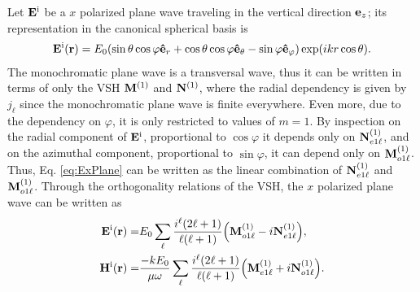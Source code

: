 
 Let $\vb{E}^{\text{i}}$ be a $x$ polarized plane wave traveling in the vertical direction $\vb{e}_z$; its representation in the canonical spherical basis is
 \begin{align}
 \vb{E}^{\text{i}} (\vb{r})= E_0\qty(\sin\theta\cos\varphi \vu{e}_r +
					\cos\theta\cos\varphi \vu{e}_\theta
					- \sin\varphi \vu{e}_\varphi) \exp(ikr\cos\theta).
	\label{eq:ExPlane}
 \end{align}
The monochromatic plane wave is a transversal wave, thus it can be written in terms of only the VSH $\vb{M}^{(1)}$ and $\vb{N}^{(1)}$, where the radial dependency is given by $j_\ell$ since the monochromatic plane wave is finite everywhere. Even more, due to the dependency on $\varphi$, it is only restricted to values of $m = 1$. By inspection on the radial component of $\vb{E}^\text{i}$, proportional to $\cos\varphi$ it depends only on $\vb{N}_{e1\ell}^{(1)}$, and on the azimuthal component, proportional to $\sin\varphi$, it can depend only on $\vb{M}_{o1\ell}^{(1)}$. Thus, Eq. \eqref{eq:ExPlane} can be written as the linear combination of  $\vb{N}_{e1\ell}^{(1)}$ and $\vb{M}_{o1\ell}^{(1)}$. Through the orthogonality relations of the VSH, the $x$ polarized plane wave can be written as \cite{stratton_electromagnetic_2012}
  \begin{subequations}
 \begin{align}
 \vb{E}^\text{i} (\vb{r})=& E_0 \sum_\ell\frac{i^\ell(2\ell+1)}{\ell(\ell+1)}\qty( \vb{M}_{o1\ell}^{(1)} -i \vb{N}_{e1\ell}^{(1)}),
\\
 \vb{H}^\text{i} (\vb{r})=& \frac{-kE_0}{\mu\omega} \sum_\ell\frac{i^\ell(2\ell+1)}{\ell(\ell+1)}\qty( \vb{M}_{e1\ell}^{(1)} +i \vb{N}_{o1\ell}^{(1)}).
 \end{align}%
 \label{eq:plane waveMultipole}%
   \end{subequations}%
%

